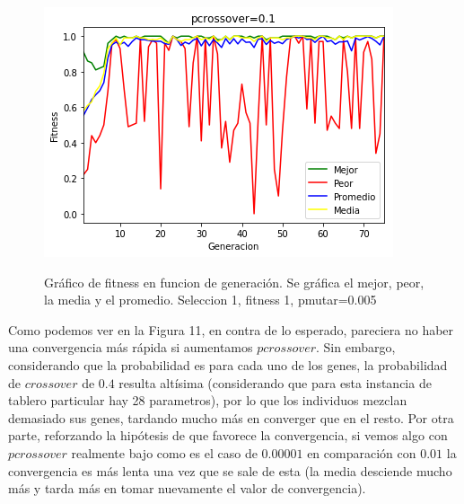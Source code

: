 \documentclass[A4paper,oneside,fleqn,11pt]{article}
\theoremstyle{definition}
\begin{document}
\begin{figure}[H]
	\captionsetup[subfigure]{position=b}
	\centering
		{\includegraphics[width=0.3\linewidth]{crossover1.png}}
	\caption{Gráfico de fitness en funcion de generación. Se gráfica el mejor, peor, la media y el promedio. Seleccion 1, fitness 1, pmutar=0.005}
\end{figure}

Como podemos ver en la Figura 11, en contra de lo esperado, pareciera no haber una convergencia más rápida si aumentamos $pcrossover$. Sin embargo, considerando que la probabilidad es para cada uno de los genes, la probabilidad de $crossover$ de $0.4$ resulta altísima (considerando que para esta instancia de tablero particular hay 28 parametros), por lo que los individuos mezclan demasiado sus genes, tardando mucho más en converger que en el resto. Por otra parte, reforzando la hipótesis de que favorece la convergencia, si vemos algo con $pcrossover$ realmente bajo como es el caso de $0.00001$ en comparación con $0.01$ la convergencia es más lenta una vez que se sale de esta (la media desciende mucho más y tarda más en tomar nuevamente el valor de convergencia).
\end{document}
